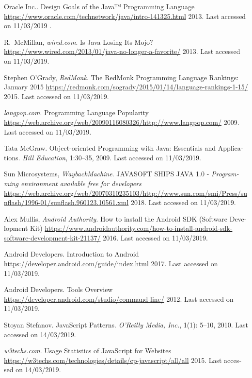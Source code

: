 \begin{thebibliography}{1}
\bibitem{[JAVA3]} {\textlatin{
{Oracle Inc.}.
Design Goals of the Java™ Programming Language
\url{https://www.oracle.com/technetwork/java/intro-141325.html}
  2013. Last accessed on 11/03/2019 }}.
  
\bibitem{[JAVA4]} {\textlatin{
{R.~McMillan, {\em wired.com}}.
Is Java Losing Its Mojo?
\url{https://www.wired.com/2013/01/java-no-longer-a-favorite/}
  2013. Last accessed on 11/03/2019}}.
  
\bibitem{[JAVA5]} {\textlatin{
{Stephen O'Grady, {\em RedMonk}}.
The RedMonk Programming Language Rankings: January 2015
\url{https://redmonk.com/sogrady/2015/01/14/language-rankings-1-15/}
  2015. Last accessed on 11/03/2019}}.
  
\bibitem{[JAVA6]} {\textlatin{
{{\em langpop.com}}.
Programming Language Popularity
\url{https://web.archive.org/web/20090116080326/http://www.langpop.com/}
  2009. Last accessed on 11/03/2019}}.
  
\bibitem{[JAVA7]} {\textlatin{
{Tata McGraw}. 
Object-oriented Programming with Java: Essentials and Applications.
{\em Hill Education}, 1:30--35, 2009. Last accessed on 11/03/2019}}.  

\bibitem{[JAVA8]} {\textlatin{
{Sun Microsystems, {\em WaybackMachine}}.
JAVASOFT SHIPS JAVA 1.0 - {\em
Programming environment available free for developers}
\url{https://web.archive.org/web/20070310235103/http://www.sun.com/smi/Press/sunflash/1996-01/sunflash.960123.10561.xml}
  2018. Last accessed on 11/03/2019}}.  
  
\bibitem{[JAVA9]} {\textlatin{
{Alex Mullis, {\em Android Authority}}.
How to install the Android SDK (Software Development Kit)
\url{https://www.androidauthority.com/how-to-install-android-sdk-software-development-kit-21137/}
  2016. Last accessed on 11/03/2019}}. 
  
\bibitem{[JAVA10]} {\textlatin{
{Android Developers}.
Introduction to Android
\url{https://developer.android.com/guide/index.html}
  2017. Last accessed on 11/03/2019}}.  
  
\bibitem{[JAVA11]} {\textlatin{
{Android Developers}.
Tools Overview
\url{https://developer.android.com/studio/command-line/}
  2012. Last accessed on 11/03/2019}}.  
  
\bibitem{[JS1]} {\textlatin{
Stoyan Stefanov.
JavaScript Patterns.
{\em O'Reilly Media, Inc.}, 1(1): 5--10, 2010. Last accessed on 14/03/2019}}.  

\bibitem{[JS2]} {\textlatin{
{{\em w3techs.com}}.
Usage Statistics of JavaScript for Websites
\url{https://w3techs.com/technologies/details/cp-javascript/all/all}
  2015. Last accessed on 14/03/2019}}. 
  

\end{thebibliography}
